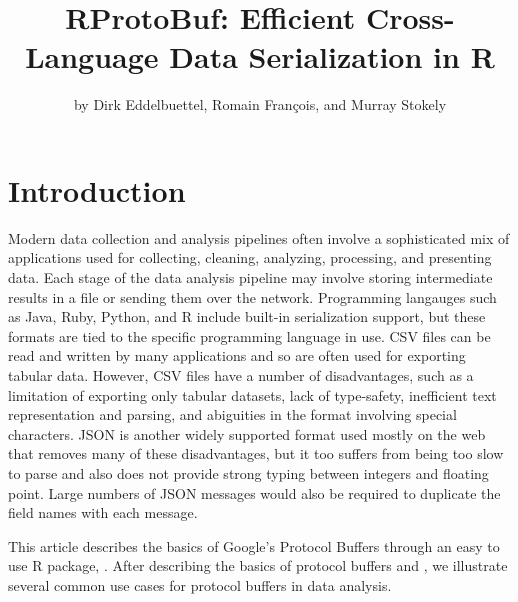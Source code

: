 \title{RProtoBuf: Efficient Cross-Language Data Serialization in R}
\author{by Dirk Eddelbuettel, Romain Fran\c{c}ois, and Murray Stokely}

\maketitle



\section{Introduction}

Modern data collection and analysis pipelines often involve a
sophisticated mix of applications used for collecting, cleaning,
analyzing, processing, and presenting data.  Each stage of the data
analysis pipeline may involve storing intermediate results in a
file or sending them over the network.  Programming langauges such as
Java, Ruby, Python, and R include built-in serialization support, but
these formats are tied to the specific programming language in use.
CSV files can be read and written by many applications and so are
often used for exporting tabular data.  However, CSV files have a
number of disadvantages, such as a limitation of exporting only
tabular datasets, lack of type-safety, inefficient text representation
and parsing, and abiguities in the format involving special
characters.  JSON is another widely supported format used mostly on
the web that removes many of these disadvantages, but it too suffers
from being too slow to parse and also does not provide strong typing
between integers and floating point.  Large numbers of JSON messages
would also be required to duplicate the field names with each message.

This article describes the basics of Google's Protocol Buffers through
an easy to use R package, .  After describing the
basics of protocol buffers and , we illustrate
several common use cases for protocol buffers in data analysis.

